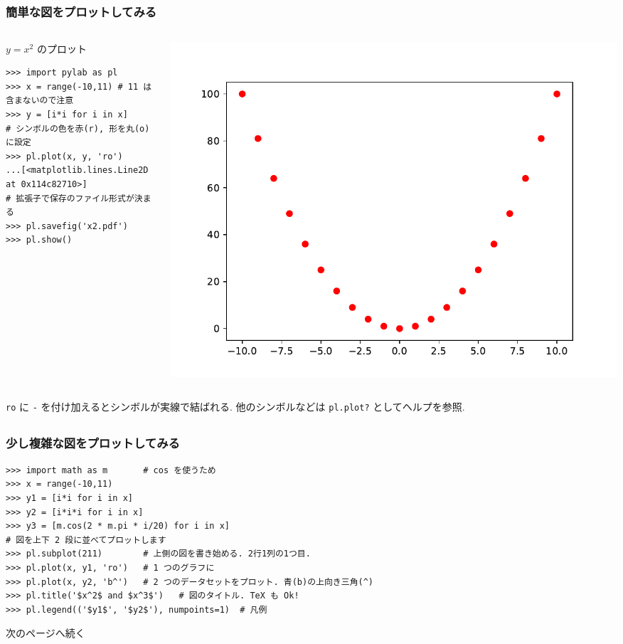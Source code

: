 \subsection*{\redm\whiteb\greenb}
\begin{frame}[t,fragile]
\frametitle{簡単な図をプロットしてみる}
\begin{columns}
\begin{column}{6cm}
$y = x^2$ のプロット
\begin{lstlisting}
>>> import pylab as pl
>>> x = range(-10,11) # 11 は含まないので注意
>>> y = [i*i for i in x]
# シンボルの色を赤(r), 形を丸(o)に設定
>>> pl.plot(x, y, 'ro')
...[<matplotlib.lines.Line2D at 0x114c82710>]
# 拡張子で保存のファイル形式が決まる
>>> pl.savefig('x2.pdf') 
>>> pl.show()
\end{lstlisting}
\end{column}

\begin{column}{6cm}
\includegraphics[width=\textwidth]{x2.pdf}
\end{column}
\end{columns}
\verb|ro| に \verb|-| を付け加えるとシンボルが実線で結ばれる.
他のシンボルなどは \verb|pl.plot?| としてヘルプを参照.
\end{frame}

\subsection*{\redm\whitem\greenb}
\begin{frame}[t,fragile]
\frametitle{少し複雑な図をプロットしてみる}
\begin{lstlisting}
>>> import math as m       # cos を使うため
>>> x = range(-10,11)
>>> y1 = [i*i for i in x]
>>> y2 = [i*i*i for i in x]
>>> y3 = [m.cos(2 * m.pi * i/20) for i in x]
# 図を上下 2 段に並べてプロットします
>>> pl.subplot(211)        # 上側の図を書き始める. 2行1列の1つ目.
>>> pl.plot(x, y1, 'ro')   # 1 つのグラフに
>>> pl.plot(x, y2, 'b^')   # 2 つのデータセットをプロット. 青(b)の上向き三角(^)
>>> pl.title('$x^2$ and $x^3$')   # 図のタイトル. TeX も Ok!
>>> pl.legend(('$y1$', '$y2$'), numpoints=1)  # 凡例
\end{lstlisting}
次のページへ続く
\end{frame}

